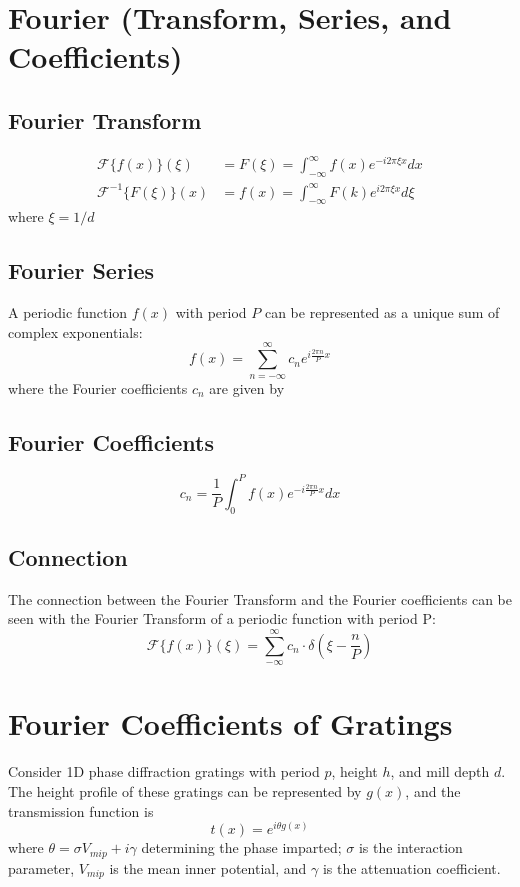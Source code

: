\documentclass[12pt]{article}
\providecommand{\FT}[1]{\ensuremath{\mathcal{F}\{#1\}}}   %
\providecommand{\FTinverse}[1]{\ensuremath{\mathcal{F}^{-1}\{#1\}}}   %
\begin{document}
\section{Fourier (Transform, Series, and Coefficients)}
\subsection{Fourier Transform}
\begin{align}
    \FT{f(x)}(\xi) &= F(\xi)  = \int_{-\infty}^{\infty} f(x) e^{-i 2\pi \xi x} dx\\
    \FTinverse{F(\xi)}(x) &= f(x) = \int_{-\infty}^{\infty} F(k) e^{i 2\pi \xi x} d\xi
\end{align}
where $\xi = 1/d$ 
\subsection{Fourier Series}
A periodic function $f(x)$ with period $P$ can be represented as a unique sum of
complex exponentials:
\begin{equation}
    f(x) = \sum_{n=-\infty}^{\infty} c_n e^{i \frac{2\pi n}{P} x}
\end{equation}
where the Fourier coefficients $c_n$ are given by
\subsection{Fourier Coefficients}
\begin{equation}
    c_n = \frac{1}{P} \int_{0}^{P} f(x) e^{-i \frac{2\pi n}{P} x} dx
\end{equation}

\subsection{Connection}
The connection between the Fourier Transform and the Fourier coefficients can be seen with
the Fourier Transform of a periodic function with period P:
\begin{equation*}
    \FT{f(x)}(\xi) = \sum_{-\infty}^{\infty} c_n \cdot \delta(\xi - \frac{n}{P})
\end{equation*}

\section{Fourier Coefficients of Gratings}
Consider 1D phase diffraction gratings with period $p$, height $h$, and mill depth $d$. The 
height profile of these gratings can be represented by $g(x)$, and the transmission function is
\begin{equation}
    t(x) = e^{i \theta g(x)}
\end{equation}
where $\theta = \sigma V_{mip} + i \gamma$ determining the phase imparted; $\sigma$ is the interaction parameter, 
$V_{mip}$ is the mean inner potential, and $\gamma$ is the attenuation coefficient.
\end{document}

